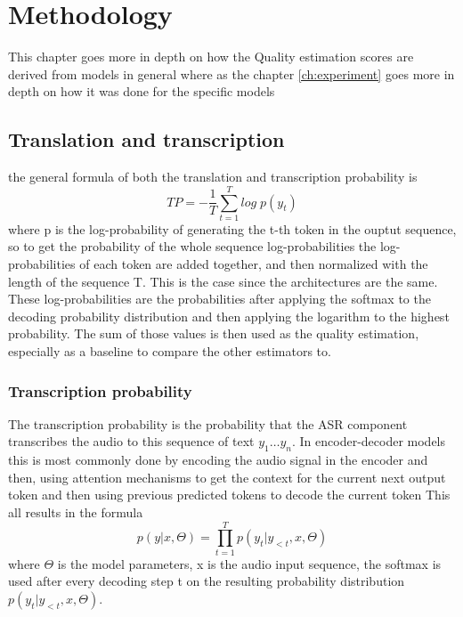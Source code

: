 
\chapter{Methodology}
\label{ch:methods}
This chapter goes more in depth on how the Quality estimation scores are derived from models in general where as the chapter \ref{ch:experiment} goes more in depth on how it was done for the specific models

\section{Translation and transcription}
the general formula of both the translation and transcription probability is $$TP=-\frac{1}{T}\sum_{t=1}^T log\; p(y_t) \label{formula:translation Probability}$$
where p is the log-probability of generating the t-th token in the ouptut sequence, so to get the probability of the whole sequence log-probabilities the log-probabilities of each token are added together, and then normalized with the length of the sequence T. 
This is the case since the architectures are the same.
These log-probabilities are the probabilities after applying the softmax to the decoding probability distribution and then applying the logarithm to the highest probability.
The sum of those values is then used as the quality estimation, especially as a baseline to compare the other estimators to.


\subsection{Transcription probability}
The transcription probability is the probability that the ASR component transcribes the audio to this sequence of text $y_1\dots y_n$. 
In encoder-decoder models this is most commonly done by encoding the audio signal in the encoder and then, using attention mechanisms to get the context for the current next output token and then using previous predicted tokens to decode the current token
This all results in the formula $$p(y|x,\Theta)=\prod_{t=1}^T p(y_t|y_{<t}, x, \Theta) $$ where $\Theta$ is the model parameters, x is the audio input sequence, the softmax is used after every decoding step t on the resulting probability distribution $p(y_t|y_{<t}, x,\Theta)$. 

